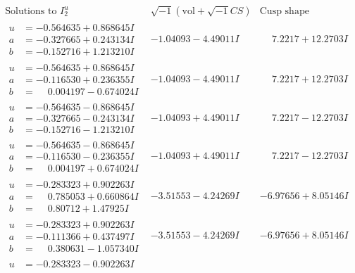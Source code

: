 \documentclass[1p]{elsarticle_modified}
\theoremstyle{definition}
\newcommand{\I}{\sqrt{-1}}
\begin{document}
$$\begin{array}{c|c|c}  
\text{Solutions to }I^u_{2}& \I (\text{vol} + \sqrt{-1}CS) & \text{Cusp shape}\\
 \hline 
\begin{aligned}
u &= -0.564635 + 0.868645 I \\
a &= -0.327665 + 0.243134 I \\
b &= -0.152716 + 1.213210 I\end{aligned}
 & -1.04093 - 4.49011 I & \phantom{-}7.2217 + 12.2703 I \\ \hline\begin{aligned}
u &= -0.564635 + 0.868645 I \\
a &= -0.116530 + 0.236355 I \\
b &= \phantom{-}0.004197 - 0.674024 I\end{aligned}
 & -1.04093 - 4.49011 I & \phantom{-}7.2217 + 12.2703 I \\ \hline\begin{aligned}
u &= -0.564635 - 0.868645 I \\
a &= -0.327665 - 0.243134 I \\
b &= -0.152716 - 1.213210 I\end{aligned}
 & -1.04093 + 4.49011 I & \phantom{-}7.2217 - 12.2703 I \\ \hline\begin{aligned}
u &= -0.564635 - 0.868645 I \\
a &= -0.116530 - 0.236355 I \\
b &= \phantom{-}0.004197 + 0.674024 I\end{aligned}
 & -1.04093 + 4.49011 I & \phantom{-}7.2217 - 12.2703 I \\ \hline\begin{aligned}
u &= -0.283323 + 0.902263 I \\
a &= \phantom{-}0.785053 + 0.660864 I \\
b &= \phantom{-}0.80712 + 1.47925 I\end{aligned}
 & -3.51553 - 4.24269 I & -6.97656 + 8.05146 I \\ \hline\begin{aligned}
u &= -0.283323 + 0.902263 I \\
a &= -0.111366 + 0.437497 I \\
b &= \phantom{-}0.380631 - 1.057340 I\end{aligned}
 & -3.51553 - 4.24269 I & -6.97656 + 8.05146 I \\ \hline\begin{aligned}
u &= -0.283323 - 0.902263 I \\

\end{aligned}
\end{array}$$
\end{document}
